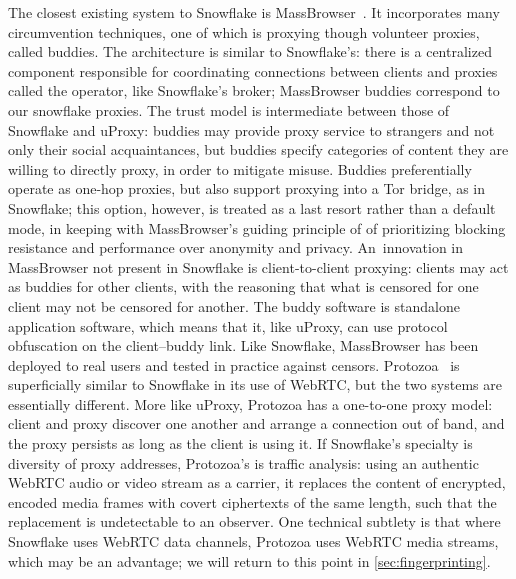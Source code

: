 \documentclass[letterpaper,twocolumn]{article}
\begin{document}
The closest existing system to Snowflake is MassBrowser~\cite{Nasr2020a}.
It incorporates many circumvention techniques, one of which is
proxying though volunteer proxies, called buddies.
The architecture is similar to Snowflake's:
there is a centralized component responsible for coordinating
connections between clients and proxies called the operator,
like Snowflake's broker;
MassBrowser buddies correspond to our snowflake proxies.
The trust model is intermediate between those of Snowflake and uProxy:
buddies may provide proxy service to strangers and not only their social acquaintances,
but buddies specify categories of content they are willing to directly proxy,
in order to mitigate misuse.
Buddies preferentially operate as one-hop proxies,
but also support proxying into a Tor bridge, as in Snowflake;
this option, however, is treated as a last resort rather than a default mode,
in keeping with MassBrowser's guiding principle of
of prioritizing blocking resistance and performance
over anonymity and privacy.
An~innovation in MassBrowser not present in Snowflake is client-to-client proxying:
clients may act as buddies for other clients,
with the reasoning that what is censored for one client may not be censored for another.
The buddy software is standalone application software,
which means that it, like uProxy, can use protocol obfuscation
on the client--buddy link.
Like Snowflake, MassBrowser has been deployed to real users
and tested in practice against censors.
Protozoa~\cite{Barradas2020a}
is superficially similar
to Snowflake in its use of WebRTC,
but the two systems are essentially different.
More like uProxy, Protozoa has a one-to-one proxy model:
client and proxy discover one another and arrange a connection out of band,
and the proxy persists as long as the client is using it.
If Snowflake's specialty is diversity of proxy addresses,
Protozoa's is traffic analysis:
using an authentic WebRTC audio or video stream as a carrier,
it replaces the content of encrypted, encoded media frames
with covert ciphertexts of the same length,
such that the replacement is undetectable to an observer.
One technical subtlety is that where Snowflake uses
WebRTC data channels,
Protozoa uses WebRTC media streams,
which may be an advantage;
we will return to this point in \autoref{sec:fingerprinting}.
\end{document}
